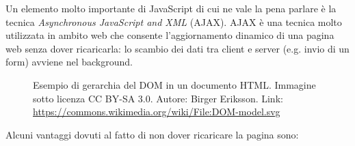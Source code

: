 \documentclass[12pt]{report}
\begin{document}
Un elemento molto importante di JavaScript di cui ne vale la pena parlare è la tecnica \emph{Asynchronous JavaScript and XML} (AJAX). AJAX è una tecnica molto utilizzata in ambito web che consente l'aggiornamento dinamico di una pagina web senza dover ricaricarla: lo scambio dei dati tra client e server (e.g. invio di un form) avviene nel background.
\begin{figure}[H]
	\caption{Esempio di gerarchia del DOM in un documento HTML. Immagine sotto licenza CC BY-SA 3.0. Autore: Birger Eriksson. Link: \url{https://commons.wikimedia.org/wiki/File:DOM-model.svg}}
	\label{fig:dom}
\end{figure}

\noindent Alcuni vantaggi dovuti al fatto di non dover ricaricare la pagina sono: 
 
\end{document}

